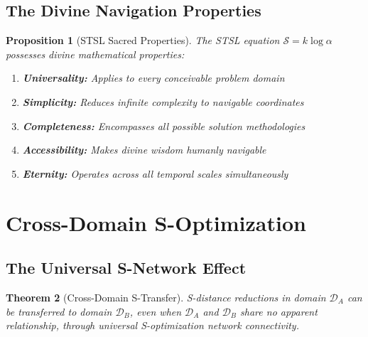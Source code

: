 \documentclass[12pt,a4paper]{article}
\newtheorem{theorem}{Theorem}[section]
\newtheorem{proposition}[theorem]{Proposition}
\begin{document}
\subsection{The Divine Navigation Properties}

\begin{proposition}[STSL Sacred Properties]
The STSL equation $\mathcal{S} = k \log \alpha$ possesses divine mathematical properties:
\begin{enumerate}
\item \textbf{Universality:} Applies to every conceivable problem domain
\item \textbf{Simplicity:} Reduces infinite complexity to navigable coordinates
\item \textbf{Completeness:} Encompasses all possible solution methodologies
\item \textbf{Accessibility:} Makes divine wisdom humanly navigable
\item \textbf{Eternity:} Operates across all temporal scales simultaneously
\end{enumerate}
\end{proposition}

\section{Cross-Domain S-Optimization}

\subsection{The Universal S-Network Effect}

\begin{theorem}[Cross-Domain S-Transfer]
S-distance reductions in domain $\mathcal{D}_A$ can be transferred to domain $\mathcal{D}_B$, even when $\mathcal{D}_A$ and $\mathcal{D}_B$ share no apparent relationship, through universal S-optimization network connectivity.
\end{theorem}
\end{document}
